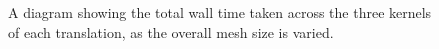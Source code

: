 \begin{figure}[H]
    \centering
    
    \caption{A diagram showing the total wall time taken across the three kernels of each translation, as the overall mesh size is varied.}
    \label{fig:translations_total_line}
\end{figure}

%     





